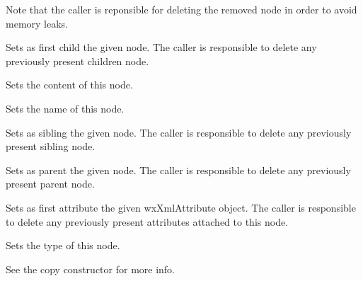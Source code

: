 Note that the caller is reponsible for deleting the removed node in order to avoid memory leaks.

\label{wxxmlnodesetchildren}


Sets as first child the given node. The caller is responsible to delete any previously present
children node.

\label{wxxmlnodesetcontent}


Sets the content of this node.

\label{wxxmlnodesetname}


Sets the name of this node.

\label{wxxmlnodesetnext}


Sets as sibling the given node. The caller is responsible to delete any previously present
sibling node.

\label{wxxmlnodesetparent}


Sets as parent the given node. The caller is responsible to delete any previously present
parent node.

\label{wxxmlnodesetattributes}


Sets as first attribute the given wxXmlAttribute object.
The caller is responsible to delete any previously present attributes attached to this node.

\label{wxxmlnodesettype}


Sets the type of this node.

\label{wxxmlnodeoperatorassign}


See the copy constructor for more info.

